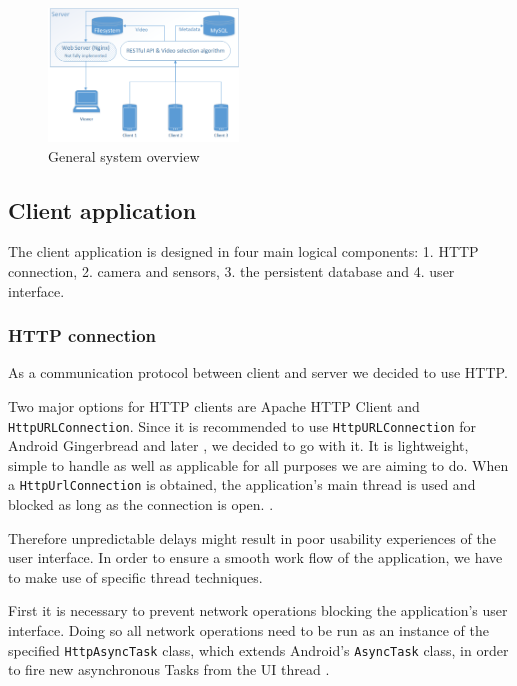 \documentclass[conference]{IEEEtran}
\begin{document}
\begin{figure}[!t]
	\centering
	\includegraphics[width=0.45\textwidth]{sys_arch.png}
	\caption{General system overview}
	\label{fig:gen_arch}
\end{figure}

\subsection{Client application}

The client application is designed in four main logical components: 1. HTTP connection, 2. camera and sensors, 3. the persistent database and 4. user interface.

\subsubsection{HTTP connection}
As a communication protocol between client and server we decided to use HTTP.

Two major options for HTTP clients are Apache HTTP Client and \texttt{HttpURLConnection}.
Since it is recommended to use \texttt{HttpURLConnection} for Android Gingerbread and later \cite{jesse_wilson_androids},
we decided to go with it.
It is lightweight, simple to handle as well as applicable for all purposes we are aiming to do.
When a \texttt{HttpUrlConnection} is obtained, the application's main thread is used and blocked as long as the connection is open. \cite{gilles_debunne_androids}.

Therefore unpredictable delays might result in poor usability experiences of the user interface.
In order to ensure a smooth work flow of the application, we have to make use of specific thread techniques.

First it is necessary to prevent network operations blocking the application's user interface.
Doing so all network operations need to be run as an instance
of the specified \texttt{HttpAsyncTask} class, which extends Android's \texttt{AsyncTask} class, in order to fire new asynchronous Tasks from the UI thread \cite{gilles_debunne_androids}.
\end{document}
